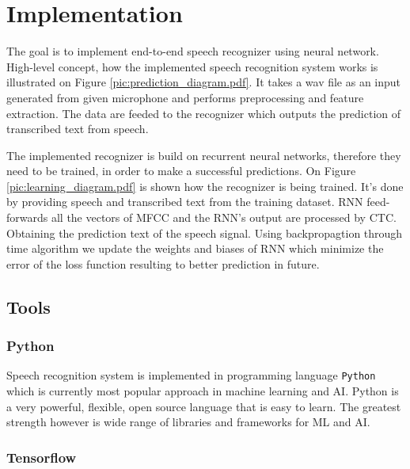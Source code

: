 \chapter{Implementation}

The goal is to implement end-to-end speech recognizer using neural network.
High-level concept, how the implemented speech recognition system works is illustrated on Figure \ref{pic:prediction_diagram.pdf}.
It takes a wav file as an input generated from given microphone and performs preprocessing and feature extraction.
The data are feeded to the recognizer which outputs the prediction of transcribed text from speech.


The implemented recognizer is build on recurrent neural networks, therefore they need to be trained, in order to make a successful predictions.
On Figure \ref{pic:learning_diagram.pdf} is shown how the recognizer is being trained.
It's done by providing speech and transcribed text from the training dataset.
RNN feed-forwards all the vectors of MFCC and the RNN's output are processed by CTC. Obtaining the prediction text of the speech signal.
Using backpropagtion through time algorithm we update the weights and biases of RNN which minimize the error of the loss function resulting to better prediction in future.



\section{Tools}

\subsection{Python}

Speech recognition system is implemented in programming language \texttt{Python} which is currently most popular approach in machine learning and AI.
Python is a very powerful, flexible, open source language that is easy to learn.
The greatest strength however is wide range of libraries and frameworks for ML and AI.

\subsection{Tensorflow}

